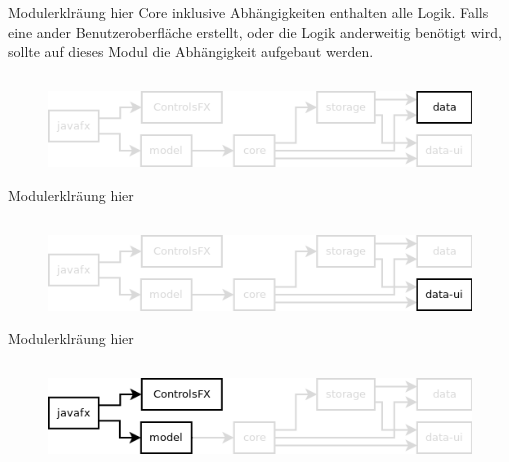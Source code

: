 Modulerklräung hier
Core inklusive Abhängigkeiten enthalten alle Logik. Falls eine ander Benutzeroberfläche erstellt,
oder die Logik anderweitig benötigt wird, sollte auf dieses Modul die Abhängigkeit aufgebaut werden.




\subsection{\textModData}
\label{\textModData}
\begin{figure}[hb!]
	\centering
	\includegraphics[width=.8\textwidth]{module_dependencies_data.png}
\end{figure}

Modulerklräung hier




\subsection{\textModDataUI}
\label{\textModDataUI}
\begin{figure}[hb!]
	\centering
	\includegraphics[width=.8\textwidth]{module_dependencies_data-ui.png}
\end{figure}

Modulerklräung hier




\subsection{\textModJavaFX}
\label{\textModJavaFX}
\begin{figure}[hb!]
	\centering
	\includegraphics[width=.8\textwidth]{module_dependencies_javafx.png}
\end{figure}

